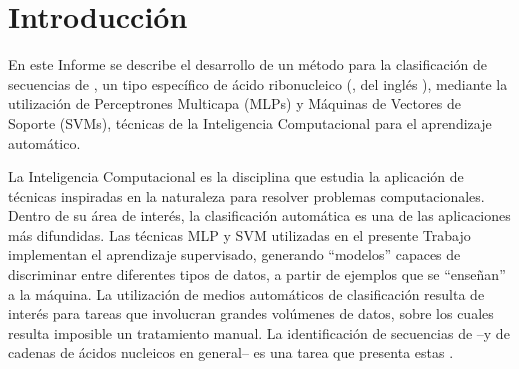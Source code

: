 %
%
%
\chapter{Introducción}
\setcounter{page}{1}
%
En este Informe se describe el desarrollo de un método para la
clasificación de secuencias de \premirna{}, un tipo específico de
ácido ribonucleico (, del inglés ),
mediante la utilización de Perceptrones Multicapa (MLPs) y Máquinas de
Vectores de Soporte (SVMs), técnicas de la Inteligencia Computacional
para el aprendizaje automático.

La Inteligencia Computacional es la disciplina que estudia la
aplicación de técnicas inspiradas en la naturaleza para resolver
problemas computacionales.
Dentro de su área de interés, la clasificación automática
es una de las aplicaciones más difundidas.
Las técnicas MLP y SVM utilizadas en el presente Trabajo implementan
el aprendizaje supervisado, generando ``modelos'' capaces de
discriminar entre diferentes tipos de datos, a partir de ejemplos que
se ``enseñan'' a la máquina.
La utilización de medios automáticos de clasificación resulta de
interés para tareas que involucran grandes volúmenes de datos, sobre
los cuales resulta imposible un tratamiento manual.
La identificación de secuencias de  --y de
cadenas de ácidos nucleicos en general-- es una tarea que
presenta estas .
